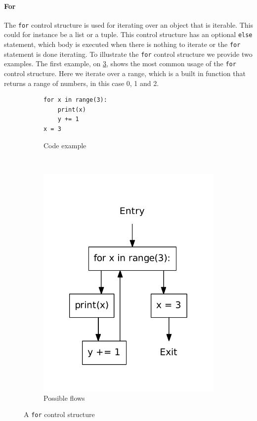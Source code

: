 \paragraph{For}
The \texttt{for} control structure is used for iterating over an object that is iterable.
This could for instance be a list or a tuple.
This control structure has an optional \texttt{else} statement, which body is executed when there is nothing to iterate or the \texttt{for} statement is done iterating.
To illustrate the \texttt{for} control structure we provide two examples.
The first example, on \cref{python:for}, shows the most common usage of the \texttt{for} control structure.
Here we iterate over a range, which is a built in function that returns a range of numbers, in this case 0, 1 and 2.

\begin{figure}[H]
  \centering
  \begin{subfigure}[b]{0.4\textwidth}
    \begin{lstlisting}[style=python]
for x in range(3):
    print(x)
    y += 1
x = 3
    \end{lstlisting}
    \caption{Code example}\label{python:for:code}
  \end{subfigure}
  ~ %
  \begin{subfigure}[b]{0.4\textwidth}
    \centering
    \includegraphics[scale=.5]{./figures/for.pdf}
    \caption{Possible flows}
    \label{python:for:flow}
  \end{subfigure}
  \caption{A \texttt{for} control structure}
  \label{python:for}
\end{figure}
